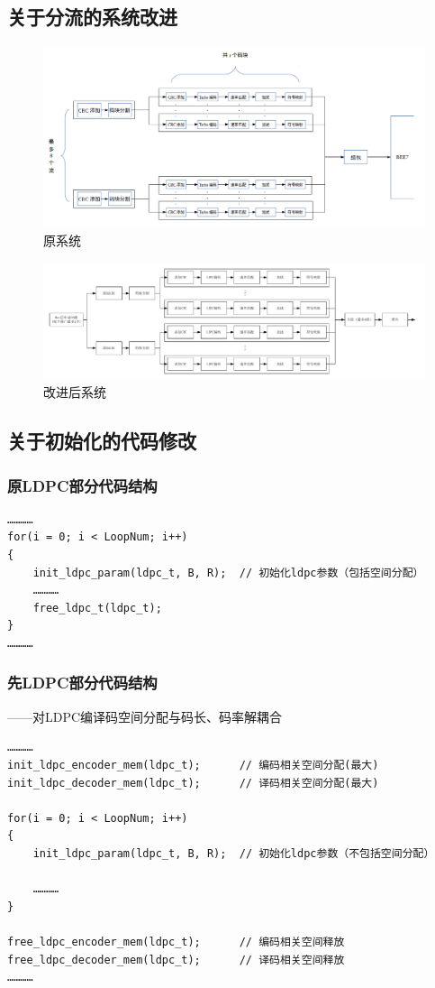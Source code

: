 \documentclass{article}
\begin{document}
\subsection{关于分流的系统改进}
\begin{figure}[H]
	\centering
	\includegraphics[width = \textwidth]{txstrulte.png}
	\caption{原系统}
\end{figure}
\begin{figure}[H]
	\centering
	\includegraphics[width = \textwidth]{txstru5g.pdf}
	\caption{改进后系统}
\end{figure}
\subsection{关于初始化的代码修改}
\subsubsection{原LDPC部分代码结构}
\lstset{language=C++}
\begin{lstlisting}
…………
for(i = 0; i < LoopNum; i++)
{
	init_ldpc_param(ldpc_t, B, R);	// 初始化ldpc参数（包括空间分配）
	…………
	free_ldpc_t(ldpc_t);
}
…………
\end{lstlisting}
\subsubsection{先LDPC部分代码结构}
——对LDPC编译码空间分配与码长、码率解耦合
\lstset{language=C++}
\begin{lstlisting}
…………
init_ldpc_encoder_mem(ldpc_t);		// 编码相关空间分配(最大)
init_ldpc_decoder_mem(ldpc_t);		// 译码相关空间分配(最大)

for(i = 0; i < LoopNum; i++)
{
	init_ldpc_param(ldpc_t, B, R);	// 初始化ldpc参数（不包括空间分配）

	…………
}

free_ldpc_encoder_mem(ldpc_t);		// 编码相关空间释放
free_ldpc_decoder_mem(ldpc_t);		// 译码相关空间释放
…………
\end{lstlisting}
\end{document}
